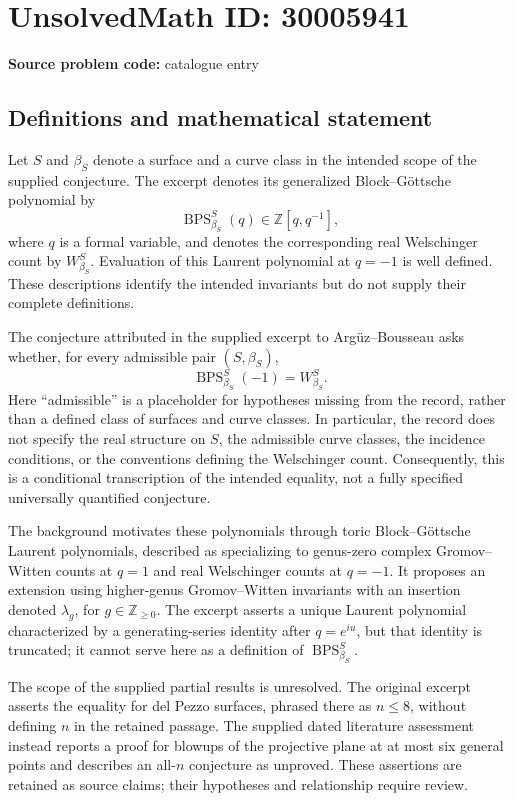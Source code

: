 \documentclass[11pt]{article}
\newcommand{\Z}{\mathbb{Z}}
\begin{document}
\section*{UnsolvedMath ID: 30005941}
\textbf{Source problem code:} catalogue entry
\subsection{Definitions and mathematical statement}
Let \(S\) and \(\beta_S\) denote a surface and a curve class in the intended scope of the supplied conjecture. The excerpt denotes its generalized Block--Göttsche polynomial by
\[
\operatorname{BPS}_{\beta_S}^{S}(q)\in\Z[q,q^{-1}],
\]
where \(q\) is a formal variable, and denotes the corresponding real Welschinger count by \(W_{\beta_S}^{S}\). Evaluation of this Laurent polynomial at \(q=-1\) is well defined. These descriptions identify the intended invariants but do not supply their complete definitions.

The conjecture attributed in the supplied excerpt to Argüz--Bousseau asks whether, for every admissible pair \((S,\beta_S)\),
\[
\operatorname{BPS}_{\beta_S}^{S}(-1)=W_{\beta_S}^{S}.
\]
Here ``admissible'' is a placeholder for hypotheses missing from the record, rather than a defined class of surfaces and curve classes. In particular, the record does not specify the real structure on \(S\), the admissible curve classes, the incidence conditions, or the conventions defining the Welschinger count. Consequently, this is a conditional transcription of the intended equality, not a fully specified universally quantified conjecture.

The background motivates these polynomials through toric Block--Göttsche Laurent polynomials, described as specializing to genus-zero complex Gromov--Witten counts at \(q=1\) and real Welschinger counts at \(q=-1\). It proposes an extension using higher-genus Gromov--Witten invariants with an insertion denoted \(\lambda_g\), for \(g\in\Z_{\geq0}\). The excerpt asserts a unique Laurent polynomial characterized by a generating-series identity after \(q=e^{iu}\), but that identity is truncated; it cannot serve here as a definition of \(\operatorname{BPS}_{\beta_S}^{S}\).

The scope of the supplied partial results is unresolved. The original excerpt asserts the equality for del Pezzo surfaces, phrased there as \(n\leq8\), without defining \(n\) in the retained passage. The supplied dated literature assessment instead reports a proof for blowups of the projective plane at at most six general points and describes an all-\(n\) conjecture as unproved. These assertions are retained as source claims; their hypotheses and relationship require review.
\end{document}
